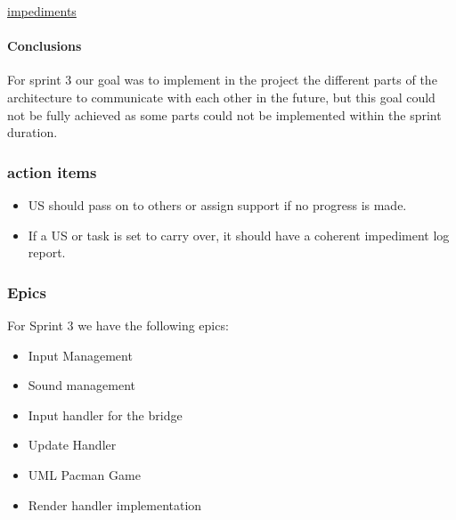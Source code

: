 \href{https://docs.google.com/spreadsheets/d/1hnMwOOVtyGWhViuAGwBsDpP79jTbHlJ09a_0gc9b4CM/edit?gid=1617748097#gid=1617748097}{impediments}

\paragraph{Conclusions}

For sprint 3 our goal was to implement in the project the different parts of the architecture to communicate with each other in the future, but this goal could not be fully achieved as some parts could not be implemented within the sprint duration.

\subsubsection{action items}

\begin{itemize}
    \item US should pass on to others or assign support if no progress is made.
    \item If a US or task is set to carry over, it should have a coherent impediment log report.
\end{itemize}

\subsubsection{Epics}

For Sprint 3 we have the following epics:

\begin{itemize}
    \item Input Management
    \item Sound management
    \item Input handler for the bridge
    \item Update Handler
    \item UML Pacman Game
    \item Render handler implementation 
\end{itemize}